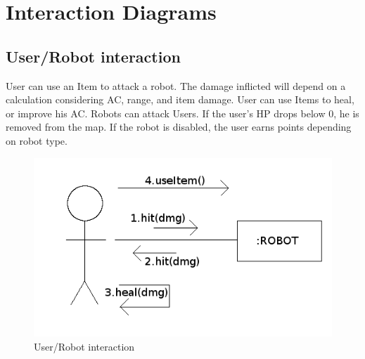 \documentclass{beamer}
\begin{document}
\section{Interaction Diagrams}
\begin{frame}
\subsection{User/Robot interaction}
User can use an Item to attack a robot. The damage inflicted will depend on a calculation considering AC, range, and item damage.
User can use Items to heal, or improve his AC.
Robots can attack Users. If the user's HP drops below 0, he is removed from the map.
If the robot is disabled, the user earns points depending on robot type.
\begin{figure}[htb]
\centering
\includegraphics[scale=0.4]{user-robot}
\caption{User/Robot interaction}
\end{figure}
\end{frame}
\end{document}

